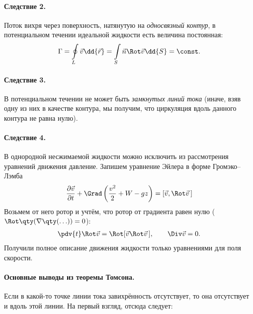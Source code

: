 \paragraph{Следствие 2.} 	Поток вихря через поверхность, натянутую на  \textit{односвязный контур}, в потенциальном течении идеальной жидкости есть величина постоянная:
	\begin{equation}\begin{aligned}
	\Gamma = \oint \limits_ { L } \vec{v} \dd{\vec{r}} = \int \limits_ { S } \vec { n }  \Rot \vec{v}\dd{S} = \const.
	\end{aligned}\end{equation}


\paragraph{Следствие 3.} В потенциальном течении не может быть \textit{замкнутых линий тока} (иначе, взяв одну из них в качестве контура, мы получим, что циркуляция вдоль данного контура не равна нулю).

\paragraph{Следствие 4.} В однородной несжимаемой жидкости можно исключить из рассмотрения уравнений движения давление.  Запишем уравнение Эйлера в форме Громэко--Лэмба
\begin{equation}
	\frac { \partial \vec{v} } { \partial t } +\Grad \left( \frac { v^2 } { 2 } + W - g z \right) = [ \vec{v} , \Rot \vec{v}\,]
\end{equation}
Возьмем от него ротор и учтём, что ротор от градиента равен нулю ($\Rot\qty(\nabla \qty(\ldots))= 0 $):
\begin{equation}\begin{aligned}
{ \pdv{t} \Rot \vec{v} = \Rot [ \vec{v} \Rot \vec{v}\, ] }, \qquad
{\Div \vec{v} = 0 }.
\end{aligned}\end{equation}
Получили полное описание движения жидкости только уравнениями для поля скорости.


\paragraph{Основные выводы из теоремы Томсона.} Если в какой-то точке линии тока завихрённость отсутствует, то она отсутствует и вдоль этой линии. На первый взгляд, отсюда следует:

